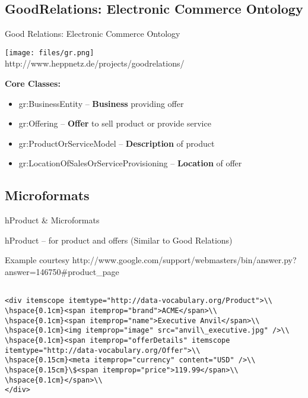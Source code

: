 \documentclass{beamer}
\begin{document}
\subsection[Good Relations]{GoodRelations: Electronic Commerce Ontology}
\begin{frame}{Good Relations: Electronic Commerce Ontology}
\begin{center}
\texttt{[image: files/gr.png]}\\
http://www.heppnetz.de/projects/goodrelations/
\end{center}
\pause
\textbf{Core Classes:}
\begin{itemize}
\item gr:BusinessEntity -- \textbf{Business} providing offer
\item gr:Offering -- \textbf{Offer} to sell product or provide service
\item gr:ProductOrServiceModel -- \textbf{Description} of product
\item gr:LocationOfSalesOrServiceProvisioning -- \textbf{Location} of offer
\end{itemize}
\end{frame}

\subsection{Microformats}
\begin{frame}{hProduct \& Microformats}
\item hProduct -- for product and offers (Similar to Good Relations)

{\tiny Example courtesy http://www.google.com/support/webmasters/bin/answer.py?answer=146750#product_page}

{\tiny\begin{verbatim}

<div itemscope itemtype="http://data-vocabulary.org/Product">\\
\hspace{0.1cm}<span itemprop="brand">ACME</span>\\
\hspace{0.1cm}<span itemprop="name">Executive Anvil</span>\\
\hspace{0.1cm}<img itemprop="image" src="anvil\_executive.jpg" />\\
\hspace{0.1cm}<span itemprop="offerDetails" itemscope itemtype="http://data-vocabulary.org/Offer">\\
\hspace{0.15cm}<meta itemprop="currency" content="USD" />\\
\hspace{0.15cm}\$<span itemprop="price">119.99</span>\\
\hspace{0.1cm}</span>\\
</div>
\end{verbatim}}
\end{frame}
\end{document}
